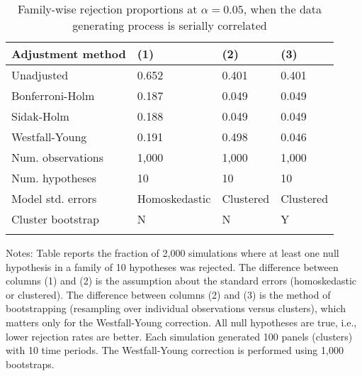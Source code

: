 \documentclass{article}
\begin{document}
\begin{table}[tbp] \centering
{}

\caption{Family-wise rejection proportions at \(\alpha = 0.05\), when the data generating process is serially correlated}
\label{tab:wyoung2}
\begin{tabularx}{\textwidth}{lCCC}

\toprule
{Adjustment method}&{(1)}&{(2)}&{(3)} \tabularnewline
\midrule\addlinespace[1.5ex]
Unadjusted&0.652&0.401&0.401 \tabularnewline
Bonferroni-Holm&0.187&0.049&0.049 \tabularnewline
Sidak-Holm&0.188&0.049&0.049 \tabularnewline
Westfall-Young&0.191&0.498&0.046 \tabularnewline
\midrule Num. observations&1,000&1,000&1,000 \tabularnewline
Num. hypotheses&10&10&10 \tabularnewline
Model std. errors&Homoskedastic&Clustered&Clustered \tabularnewline
Cluster bootstrap&N&N&Y \tabularnewline
\bottomrule \addlinespace[1.5ex]

\end{tabularx}
\begin{flushleft}
\footnotesize Notes: Table reports the fraction of 2,000 simulations where at least one null hypothesis in a family of 10 hypotheses was rejected. The difference between columns (1) and (2) is the assumption about the standard errors (homoskedastic or clustered). The difference between columns (2) and (3) is the method of bootstrapping (resampling over individual observations versus clusters), which matters only for the Westfall-Young correction. All null hypotheses are true, i.e., lower rejection rates are better. Each simulation generated 100 panels (clusters) with 10 time periods. The Westfall-Young correction is performed using 1,000 bootstraps.
\end{flushleft}
\end{table}
\end{document}
